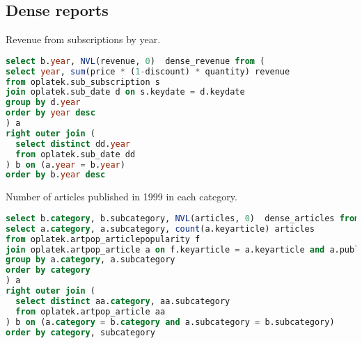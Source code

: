 \subsection{Dense reports} %
\label{sub:Dense reports}

Revenue from subscriptions by year.
\begin{lstlisting}[language=sql] 
select b.year, NVL(revenue, 0)  dense_revenue from (
select year, sum(price * (1-discount) * quantity) revenue 
from oplatek.sub_subscription s 
join oplatek.sub_date d on s.keydate = d.keydate 
group by d.year 
order by year desc
) a
right outer join (
  select distinct dd.year
  from oplatek.sub_date dd
) b on (a.year = b.year)
order by b.year desc
\end{lstlisting}

Number of articles published in 1999 in each category.
\begin{lstlisting}[language=sql] 
select b.category, b.subcategory, NVL(articles, 0)  dense_articles from (
select a.category, a.subcategory, count(a.keyarticle) articles
from oplatek.artpop_articlepopularity f
join oplatek.artpop_article a on f.keyarticle = a.keyarticle and a.publicationyear = 1999
group by a.category, a.subcategory
order by category
) a
right outer join (
  select distinct aa.category, aa.subcategory
  from oplatek.artpop_article aa
) b on (a.category = b.category and a.subcategory = b.subcategory)
order by category, subcategory
\end{lstlisting}

